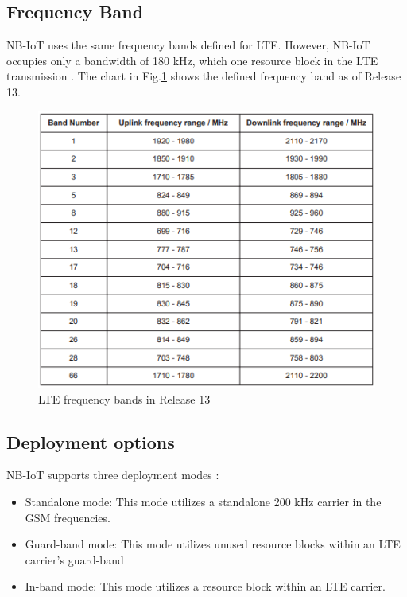 \subsection*{Frequency Band}
NB-IoT uses the same frequency bands defined for LTE. However, NB-IoT occupies only a bandwidth of 180 kHz, which one resource block in the LTE transmission \cite{NB_IoT-rohde, Masek2021}. The chart in Fig.\ref{fig:R13-freq4lte} shows the defined frequency band as of Release 13.
\begin{figure}[h!]
    \centering
    \includegraphics[width=\textwidth]{pict/R13_freq4LTE.png}
    \caption{LTE frequency bands in Release 13 \cite{NB_IoT-rohde}}
    \label{fig:R13-freq4lte}
\end{figure}

\subsection*{Deployment options}
NB-IoT supports three deployment modes \cite{NB_IoT-rohde, Masek2021, ericsson-tech-review}:
\begin{itemize}
    \item Standalone mode: This mode utilizes a standalone 200 kHz carrier in the GSM frequencies.
    \item Guard-band mode: This mode utilizes unused resource blocks within an LTE carrier's guard-band 
    \item In-band mode: This mode utilizes a resource block within an LTE carrier.
\end{itemize}

